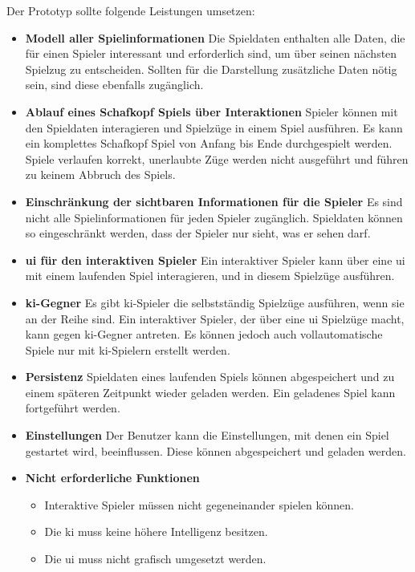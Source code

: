 \documentclass[
							a4paper, 
							11pt, 
							openany, 
							liststotoc,
							parskip=half, 
   							headings=normal
						]{scrreprt}
\begin{document}
{Der Prototyp sollte folgende Leistungen umsetzen:
\begin{itemize}
	\item \textbf{Modell aller Spielinformationen}\newline
Die Spieldaten enthalten alle Daten, die für einen Spieler interessant und erforderlich sind, um über seinen nächsten Spielzug zu entscheiden. Sollten für die Darstellung zusätzliche Daten nötig sein, sind diese ebenfalls zugänglich.	
	\item \textbf{Ablauf eines Schafkopf Spiels über Interaktionen}\newline
Spieler können mit den Spieldaten interagieren und Spielzüge in einem Spiel aus\-füh\-ren. Es kann ein komplettes Schafkopf Spiel von Anfang bis Ende durchgespielt werden. Spiele verlaufen korrekt, unerlaubte Züge werden nicht ausgeführt und führen zu keinem Abbruch des Spiels.
	\item \textbf{Einschränkung der sichtbaren Informationen für die Spieler}\newline
Es sind nicht alle Spielinformationen für jeden Spieler zugänglich. Spieldaten kön\-nen so eingeschränkt werden, dass der Spieler nur sieht, was er sehen darf.
	\item \textbf{\acs{ui} für den interaktiven Spieler}\newline
Ein interaktiver Spieler kann über eine \acs{ui} mit einem laufenden Spiel interagieren, und in diesem Spielzüge ausführen.
	\item \textbf{\acs{ki}-Gegner}\newline
Es gibt \acs{ki}-Spieler die selbstständig Spielzüge ausführen, wenn sie an der Reihe sind. Ein interaktiver Spieler, der über eine \acs{ui} Spielzüge macht, kann gegen \acs{ki}-Gegner antreten. Es können jedoch auch vollautomatische Spiele nur mit \acs{ki}-Spielern erstellt werden.
	\item \textbf{Persistenz}\newline
Spieldaten eines laufenden Spiels können abgespeichert und zu einem späteren Zeitpunkt wieder geladen werden. Ein geladenes Spiel kann fortgeführt werden.
	\item \textbf{Einstellungen}\newline
Der Benutzer kann die Einstellungen, mit denen ein Spiel gestartet wird, beeinflussen. Diese können abgespeichert und geladen werden.		
	\item \textbf{Nicht erforderliche Funktionen}
	\begin{itemize}
		\item Interaktive Spieler müssen nicht gegeneinander spielen können.
		\item Die \acs{ki} muss keine höhere Intelligenz besitzen.
		\item Die \acs{ui} muss nicht grafisch umgesetzt werden.	
	\end{itemize}
\end{itemize}\bigskip

}
\end{document}
